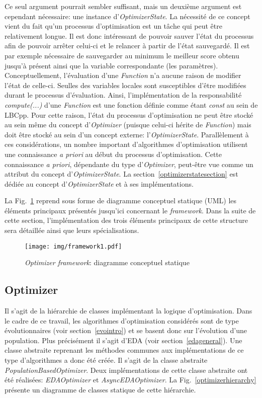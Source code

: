 \documentclass[a4paper, 12pt]{report}
\begin{document}
Ce seul argument pourrait sembler suffisant, mais un deuxième argument est cependant nécessaire: une instance d'\textit{OptimizerState}. La nécessité de ce concept vient du fait qu'un processus d'optimisation est un tâche qui peut être relativement longue. Il est donc intéressant de pouvoir sauver l'état du processus afin de pouvoir arrêter celui-ci et le relancer à partir de l'état sauvegardé. Il est par exemple nécessaire de sauvegarder au minimum le meilleur score obtenu jusqu'à présent ainsi que la variable correspondante (les paramètres). Conceptuellement, l'évaluation d'une \textit{Function} n'a aucune raison de modifier l'état de celle-ci. Seulles des variables locales sont susceptibles d'être modifiées durant le processus d'évaluation. Ainsi, l'implémentation de la responsabilité \textit{compute(...)} d'une \textit{Function} est une fonction définie comme étant \textit{const} au sein de LBCpp. Pour cette raison, l'état du processus d'optimisation ne peut être stocké au sein même du concept d'\textit{Optimizer} (puisque celui-ci hérite de \textit{Function}) mais doit être stocké au sein d'un concept externe: l'\textit{OptimizerState}. Parallèlement à ces considérations, un nombre important d'algorithmes d'optimisation utilisent une connaissance \textit{a priori} au début du processus d'optimisation. Cette connaissance \textit{a priori}, dépendante du type d'\textit{Optimizer}, peut-être vue comme un attribut du concept d'\textit{OptimizerState}. La section~\ref{optimizerstatesection} est dédiée au concept d'\textit{OptimizerState} et à ses implémentations.
 
La Fig.~\ref{framework1} reprend sous forme de diagramme conceptuel statique (UML) les éléments principaux présentés jusqu'ici concernant le \textit{framework}. Dans la suite de cette section, l'implémentation des trois éléments principaux de cette structure sera détaillée ainsi que leurs spécialisations.

\begin{figure}[!p]
\centering
\texttt{[image: img/framework1.pdf]}
\caption{\textit{Optimizer framework}: diagramme conceptuel statique}
\label{framework1}
\end{figure}

\subsection{Optimizer}
Il s'agit de la hiérarchie de classes implémentant la logique d'optimisation. Dans le cadre de ce travail, les algorithmes d'optimisation considérés sont de type évolutionnaires (voir section~\ref{evointro}) et se basent donc sur l'évolution d'une population. Plus précisément il s'agit d'EDA (voir section~\ref{edageneral}). Une classe abstraite reprenant les méthodes communes aux implémentations de ce type d'algorithmes a donc été créée. Il s'agit de la classe abstraite \textit{PopulationBasedOptimizer}. Deux implémentations de cette classe abstraite ont été réalisées: \textit{EDAOptimizer} et \textit{AsyncEDAOptimizer}. La Fig.~\ref{optimizerhierarchy} présente un diagramme de classes statique de cette hiérarchie.
\end{document}
